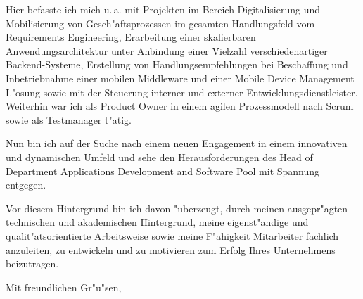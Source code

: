 \documentclass[11pt,a4paper]{dinbrief}
\begin{document}
\begin{letter}
Hier befasste ich mich u.\,a. mit Projekten im Bereich Digitalisierung und Mobilisierung von Gesch"aftsprozessen im gesamten Handlungsfeld vom Requirements Engineering, Erarbeitung einer skalierbaren Anwendungsarchitektur unter Anbindung einer Vielzahl verschiedenartiger Backend-Systeme, Erstellung von Handlungsempfehlungen bei Beschaffung und Inbetriebnahme einer mobilen Middleware und einer Mobile Device Management L"osung sowie  mit der Steuerung interner und externer Entwicklungsdienstleister. Weiterhin war ich als Product Owner in einem agilen Prozessmodell nach Scrum sowie als Testmanager t"atig.

Nun bin ich auf der Suche nach einem neuen Engagement in einem innovativen und dynamischen Umfeld und sehe den Herausforderungen des Head of Department Applications Development and Software Pool mit Spannung entgegen.

Vor diesem Hintergrund bin ich davon "uberzeugt, durch meinen ausgepr"agten technischen und akademischen Hintergrund, meine eigenst"andige und qualit"atsorientierte Arbeitsweise sowie meine F"ahigkeit Mitarbeiter fachlich anzuleiten, zu entwickeln und zu motivieren zum Erfolg Ihres Unternehmens beizutragen.

\closing{Mit freundlichen Gr"u"sen,}
\end{letter}
\end{document}

